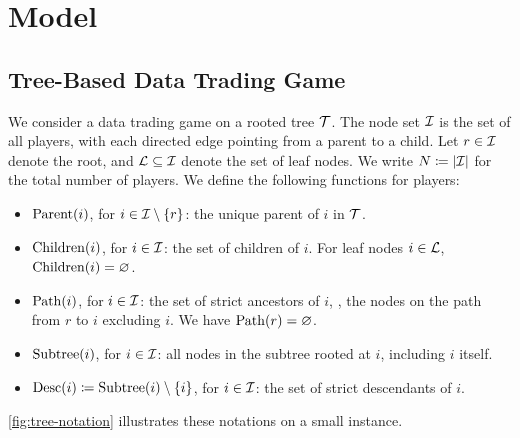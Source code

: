 \section{Model}
\label{sec:model}

\subsection{Tree-Based Data Trading Game}
\label{subsec:game}

We consider a data trading game on a rooted tree $\mathcal{T}$.
The node set $\mathcal{I}$ is the set of all players, with each directed edge pointing from a parent to a child. Let $r \in \mathcal{I}$ denote the root, and $\mathcal{L} \subseteq \mathcal{I}$ denote the set of leaf nodes. We write $N \coloneqq |\mathcal{I}|$ for the total number of players. We define the following functions for players:
\begin{itemize}[left=0em]
\item $\operatorname{Parent}(i)$, for $i \in \mathcal{I} \setminus \{r\}$: the unique parent of $i$ in $\mathcal{T}$.
\item $\operatorname{Children}(i)$, for $i \in \mathcal{I}$: the set of children of $i$. For leaf nodes $i \in \mathcal{L}$, $\operatorname{Children}(i) = \varnothing$.
\item $\operatorname{Path}(i)$, for $i \in \mathcal{I}$: the set of strict ancestors of $i$, \ie, the nodes on the path from $r$ to $i$ excluding $i$. We have $\operatorname{Path}(r) = \varnothing$.
\item $\operatorname{Subtree}(i)$, for $i \in \mathcal{I}$: all nodes in the subtree rooted at $i$, including $i$ itself.
\item $\operatorname{Desc}(i) \coloneqq \operatorname{Subtree}(i) \setminus \{i\}$, for $i \in \mathcal{I}$: the set of strict descendants of $i$.
\end{itemize}
\cref{fig:tree-notation} illustrates these notations on a small instance.

